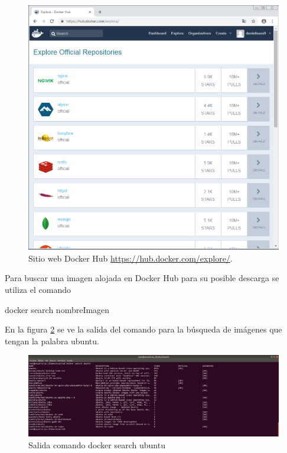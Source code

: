 \begin{figure}[!hbtp]
	\centering
	\includegraphics[width=\linewidth]{Trabajo/RecursosEducativos/RE05_Docker/Gestion_basica/REDocker_Gestion4.png}
	\vspace{-0.2cm}
	\caption{Sitio web Docker Hub \url{https://hub.docker.com/explore/}.}
	\label{fig:DockerGestion4}
\end{figure}

Para buscar una imagen alojada en Docker Hub para su posible descarga se utiliza el comando 
\begin{commandshell}docker search nombreImagen\end{commandshell}

En la figura \ref{fig:DockerGestion3} se ve la salida del comando para la búsqueda de imágenes que tengan la palabra ubuntu.

\begin{figure}[!hbtp]
	\centering
	\includegraphics[width=\linewidth]{Trabajo/RecursosEducativos/RE05_Docker/Gestion_basica/REDocker_Gestion3.png}
	\vspace{-0.2cm}
	\caption{Salida comando docker search ubuntu}
	\label{fig:DockerGestion3}
\end{figure}

